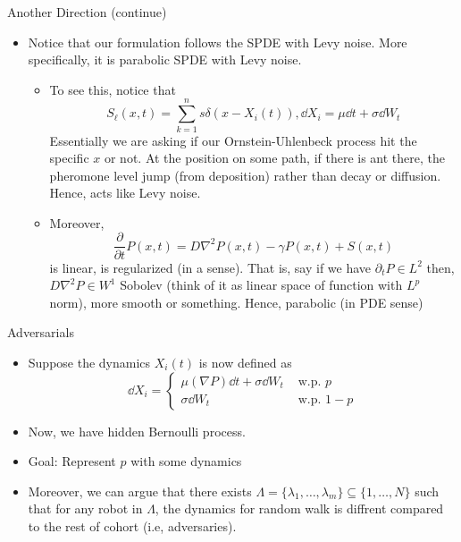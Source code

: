 \documentclass[10pt]{beamer}
\begin{document}
    \begin{frame}{Another Direction (continue)}
    \begin{itemize}
    \item Notice that our formulation follows the SPDE with Levy noise. More specifically, it is parabolic SPDE with Levy noise.
    \begin{itemize}
        \item To see this, notice that
        \[
        S_\ell(x,t) = \sum_{k=1}^n s\delta(x-X_i(t)), \dd X_i = \mu \dd t + \sigma \dd W_t 
        \]
        Essentially we are asking if our Ornstein-Uhlenbeck process hit the specific $x$ or not. At the position on some path, if there is ant there, the pheromone level jump (from deposition) rather than decay or diffusion. Hence, acts like Levy noise.
        \item Moreover,
        \[
        \dfrac{\partial}{\partial t}P(x,t) = D\nabla^2P(x,t) - \gamma P(x,t) + S(x,t)
        \]
        is linear, is regularized (in a sense). That is, say if we have $\partial_tP \in L^2$ then, $D\nabla^2P \in W^1$ Sobolev (think of it as linear space of function with $L^p$ norm), more smooth or something. Hence, parabolic (in PDE sense)
    \end{itemize}
    \end{itemize}
    \end{frame}
	\begin{frame}{Adversarials}
		\begin{itemize}
			\item Suppose the dynamics $X_i(t)$ is now defined as
				\[
				\dd X_i = \begin{cases}
				\mu(\nabla P) \dd t + \sigma \dd W_t & \text{ w.p. } p\\
				\sigma \dd W_t & \text{ w.p. } 1-p
				\end{cases}
				\]
			\item Now, we have hidden Bernoulli process.
      \item Goal: Represent $p$ with some dynamics
      \item Moreover, we can argue that there exists $\Lambda = \{\lambda_1,\dots,\lambda_m\}\subseteq \{1,\dots,N\}$ such that for any robot in $\Lambda$, the dynamics for random walk is diffrent compared to the rest of cohort (i.e, adversaries).

		\end{itemize}
	\end{frame}
\end{document}
